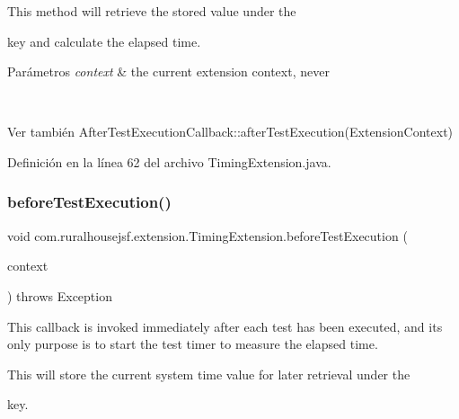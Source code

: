 This method will retrieve the stored value under the
\begin{DoxyCode}{0}
\end{DoxyCode}


key and calculate the elapsed time.


\begin{DoxyParams}{Parámetros}
{\em context} & the current extension context, never
\begin{DoxyCode}{1}
\DoxyCodeLine{\textcolor{keyword}{null} }
\end{DoxyCode}
\\
\hline
\end{DoxyParams}
\begin{DoxySeeAlso}{Ver también}
After\+Test\+Execution\+Callback\+::after\+Test\+Execution(\+Extension\+Context) 
\end{DoxySeeAlso}


Definición en la línea 62 del archivo Timing\+Extension.\+java.

\mbox{\label{classcom_1_1ruralhousejsf_1_1extension_1_1_timing_extension_ad19d0a2513bd9041f9263c1d9536ed6c}} 
\subsubsection{\texorpdfstring{beforeTestExecution()}{beforeTestExecution()}}
{\footnotesize\ttfamily void com.\+ruralhousejsf.\+extension.\+Timing\+Extension.\+before\+Test\+Execution (\begin{DoxyParamCaption}\item[{Extension\+Context}]{context }\end{DoxyParamCaption}) throws Exception}



This callback is invoked {\ttfamily immediately after} each test has been executed, and its only purpose is to start the test timer to measure the elapsed time. 

This will store the current system time value for later retrieval under the
\begin{DoxyCode}{0}
\end{DoxyCode}
 key.



